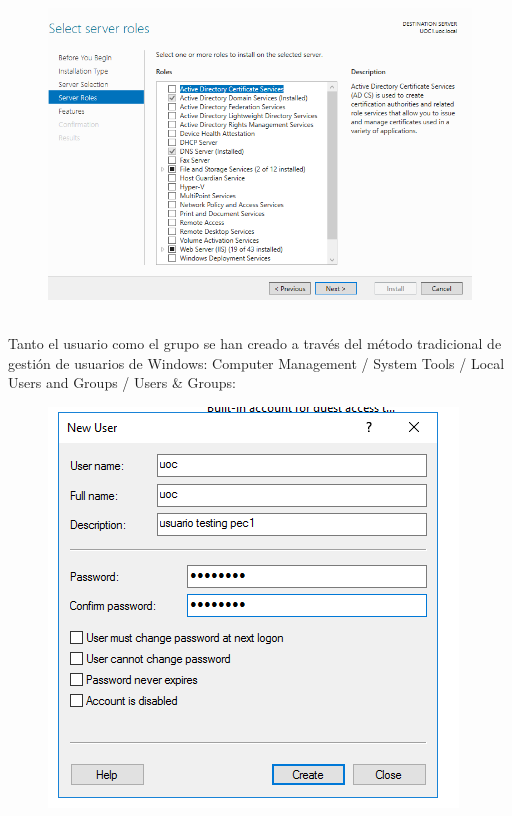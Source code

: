 \documentclass[10pt,a4paper]{article}
\begin{document}
\begin{figure}[h!]
\centering
\includegraphics[scale=0.4]{services.png}
\end{figure}

\subsection{}
Tanto el usuario como el grupo se han creado a través del método tradicional de gestión de usuarios de Windows: Computer Management / System Tools / Local Users and Groups / Users \& Groups:\\

\begin{figure}[h!]
\centering
\includegraphics[scale=0.6]{user_create.png}
\end{figure}
\end{document}
